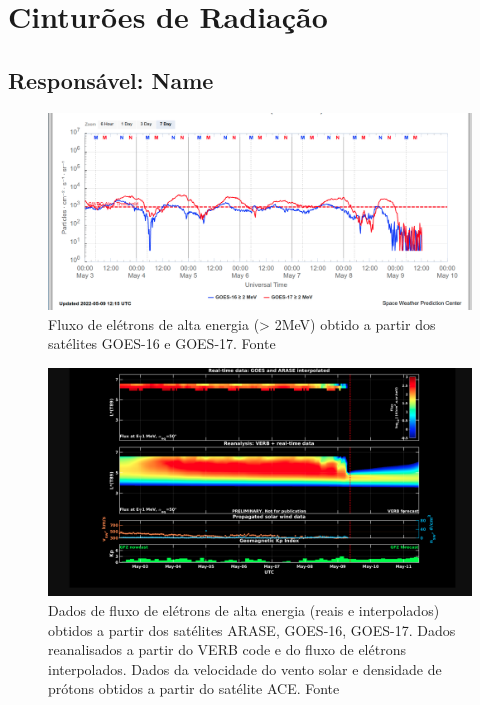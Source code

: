 \documentclass[a4paper, 10pt]{article}
\begin{document}
\section{Cinturões de Radiação} 
 \subsection{Responsável: Name} 
 
\begin{figure}[H]
    
                        \centering
   
                             \includegraphics[width=14cm]{./figures//figureRadBelts_0.png}

                             \caption{ Fluxo de elétrons de alta energia (> 2MeV) obtido a partir dos satélites GOES-16 e GOES-17. Fonte}
                        \end{figure}

                     \begin{figure}[H]
    
                        \centering
   
                             \includegraphics[width=14cm]{./figures//figureRadBelts_1.png}

                             \caption{ Dados de fluxo de elétrons de alta energia (reais e interpolados) obtidos a partir dos satélites ARASE, GOES-16, GOES-17. Dados reanalisados a partir do VERB code e do fluxo de elétrons interpolados. Dados da velocidade do vento solar e densidade de prótons obtidos a partir do satélite ACE. Fonte}
                        \end{figure}
\end{document}

